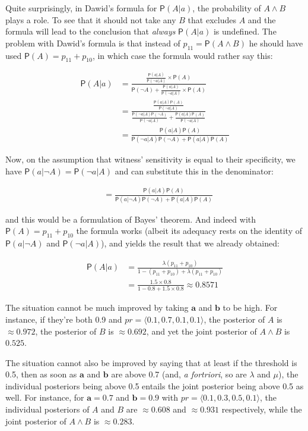\documentclass[10pt,dvipsnames,enabledeprecatedfontcommands]{scrartcl}
\newcommand{\ra}{\rangle}
\newcommand{\la}{\langle}
\newcommand{\n}{\neg}
\newcommand{\et}{\wedge}
\newcommand{\pr}[1]{\mathsf{P}(#1)}
\begin{document}
Quite surprisingly, in Dawid's formula for \(\pr{A\vert a}\), the
probability of \(A\et B\) plays a role. To see that it should not take
any \(B\) that excludes \(A\) and the formula will lead to the
conclusion that \emph{always} \(\pr{A\vert a}\) is undefined. The
problem with Dawid's formula is that instead of \(p_{11}=\pr{A\et B}\)
he should have used \(\pr{A}=p_{11}+p_{10}\), in which case the formula
would rather say this:

\begin{align*}
\pr{A\vert a } & = \frac{\frac{\pr{a\vert A}}{\pr{\n a \vert A}}\times \pr{A}}{\pr{\n A}+ \frac{\pr{a\vert A}}{\pr{\n a \vert A}} \times \pr{A}}\\
& = \frac{\frac{\pr{a\vert A}\pr{A}}{\pr{\n a \vert A}}}{\frac{\pr{\n a\vert A}\pr{\n A}}{\pr{\n a\vert A}}+ \frac{\pr{a\vert A}\pr{A}}{\pr{\n a \vert A}}}\\
& = \frac{\pr{a\vert A}\pr{A}}{\pr{\n a\vert A}\pr{\n A} + \pr{a\vert A}\pr{A}}
\end{align*}

Now, on the assumption that witness' sensitivity is equal to their
specificity, we have \(\pr{a\vert \n A}=\pr{\n a \vert A}\) and can
substitute this in the denominator:

\begin{align*} & = \frac{\pr{a\vert A}\pr{A}}{\pr{ a\vert \n A}\pr{\n A} + \pr{a\vert A}\pr{A}}\end{align*}

and this would be a formulation of Bayes' theorem. And indeed with
\(\pr{A}=p_{11}+p_{10}\) the formula works (albeit its adequacy rests on
the identity of \(\pr{a\vert \n A}\) and \(\pr{\n a \vert A}\)), and
yields the result that we already obtained:

\begin{align*}
\pr{A\vert a} &= \frac{\lambda(p_{11}+p_{10})}{1-(p_{11}+p_{10})+\lambda(p_{11}+p_{10})}\\
&= \frac{1.5\times 0.8}{1- 0.8+1.5\times 0.8} \approx 0.8571
\end{align*}

The situation cannot be much improved by taking \(\mathbf{a}\) and
\(\mathbf{b}\) to be high. For instance, if they're both 0.9 and
\(pr=\la0.1, 0.7, 0.1, 0.1 \ra\), the posterior of \(A\) is
\(\approx 0.972\), the posterior of \(B\) is \(\approx 0.692\), and yet
the joint posterior of \(A\et B\) is \(0.525\).

The situation cannot also be improved by saying that at least if the
threshold is 0.5, then as soon as \(\mathbf{a}\) and \(\mathbf{b}\) are
above 0.7 (and, \emph{a fortriori}, so are \(\lambda\) and \(\mu\)), the
individual posteriors being above 0.5 entails the joint posterior being
above 0.5 as well. For instance, for \(\mathbf{a}=0.7\) and
\(\mathbf{b}=0.9\) with \(pr= \la 0.1, 0.3, 0.5, 0.1\ra\), the
individual posteriors of \(A\) and \(B\) are \(\approx 0.608\) and
\(\approx 0.931\) respectively, while the joint posterior of \(A\et B\)
is \(\approx 0.283\).
\end{document}
